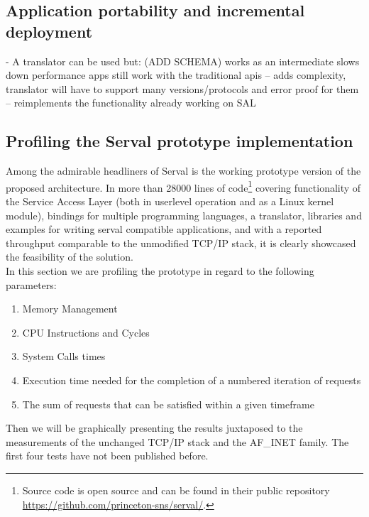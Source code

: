 \subsection{Application portability and incremental deployment}
- A translator can be used but: (ADD SCHEMA)
works as an intermediate
slows down performance
apps still work with the traditional apis
 -- adds complexity, translator will have to support many versions/protocols and error proof for them
 -- reimplements the functionality already working on SAL




\subsection{Profiling the Serval prototype implementation}
Among the admirable headliners of Serval is the working prototype version of the proposed architecture.
In more than 28000 lines of code\footnote{Source code is open source and can be found in their public repository\\ \url{https://github.com/princeton-sns/serval/}.} covering functionality of the Service Access Layer (both in userlevel operation and as a Linux kernel module), bindings for multiple programming languages, a translator, libraries and examples for writing serval compatible applications, and with a reported throughput comparable to the unmodified TCP/IP stack, it is clearly showcased the feasibility of the solution.\\
\indent In this section we are profiling the prototype in regard to the following parameters:
\begin{enumerate}
  \item Memory Management
  \item CPU Instructions and Cycles
  \item System Calls times
  \item Execution time needed for the completion of a numbered iteration of requests
  \item The sum of requests that can be satisfied within a given timeframe
\end{enumerate}
Then we will be graphically presenting the results juxtaposed to the measurements of the unchanged TCP/IP stack and the AF\_INET family. The first four tests have not been published before.
